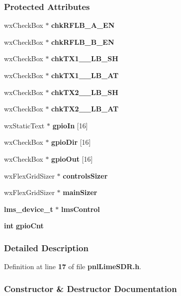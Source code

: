 \subsubsection*{Protected Attributes}
\begin{DoxyCompactItemize}
\item 
wx\+Check\+Box $\ast$ {\bf chk\+R\+F\+L\+B\+\_\+\+A\+\_\+\+EN}
\item 
wx\+Check\+Box $\ast$ {\bf chk\+R\+F\+L\+B\+\_\+\+B\+\_\+\+EN}
\item 
wx\+Check\+Box $\ast$ {\bf chk\+T\+X1\+\_\+\_\+\+L\+B\+\_\+\+SH}
\item 
wx\+Check\+Box $\ast$ {\bf chk\+T\+X1\+\_\+\_\+\+L\+B\+\_\+\+AT}
\item 
wx\+Check\+Box $\ast$ {\bf chk\+T\+X2\+\_\+\_\+\+L\+B\+\_\+\+SH}
\item 
wx\+Check\+Box $\ast$ {\bf chk\+T\+X2\+\_\+\_\+\+L\+B\+\_\+\+AT}
\item 
wx\+Static\+Text $\ast$ {\bf gpio\+In} [16]
\item 
wx\+Check\+Box $\ast$ {\bf gpio\+Dir} [16]
\item 
wx\+Check\+Box $\ast$ {\bf gpio\+Out} [16]
\item 
wx\+Flex\+Grid\+Sizer $\ast$ {\bf controls\+Sizer}
\item 
wx\+Flex\+Grid\+Sizer $\ast$ {\bf main\+Sizer}
\item 
{\bf lms\+\_\+device\+\_\+t} $\ast$ {\bf lms\+Control}
\item 
{\bf int} {\bf gpio\+Cnt}
\end{DoxyCompactItemize}


\subsubsection{Detailed Description}


Definition at line {\bf 17} of file {\bf pnl\+Lime\+S\+D\+R.\+h}.



\subsubsection{Constructor \& Destructor Documentation}
